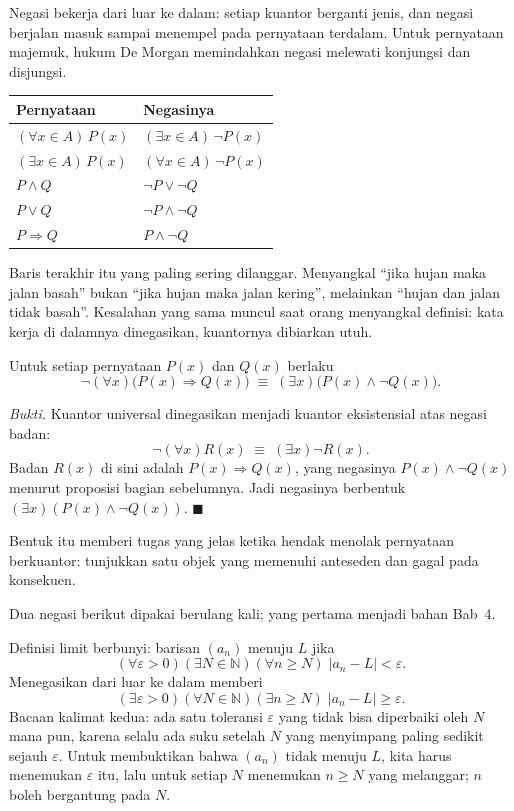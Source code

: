 Negasi bekerja dari luar ke dalam: setiap kuantor berganti jenis, dan negasi berjalan masuk
sampai menempel pada pernyataan terdalam. Untuk pernyataan majemuk, hukum De Morgan
memindahkan negasi melewati konjungsi dan disjungsi.

{\centering
\begin{tabular}{ll}
\hline
Pernyataan & Negasinya \\
\hline
$(\forall x \in A)\,P(x)$ & $(\exists x \in A)\,\neg P(x)$ \\
$(\exists x \in A)\,P(x)$ & $(\forall x \in A)\,\neg P(x)$ \\
$P \wedge Q$ & $\neg P \vee \neg Q$ \\
$P \vee Q$ & $\neg P \wedge \neg Q$ \\
$P \Rightarrow Q$ & $P \wedge \neg Q$ \\
\hline
\end{tabular}\par}

Baris terakhir itu yang paling sering dilanggar. Menyangkal ``jika hujan maka jalan
basah'' bukan ``jika hujan maka jalan kering'', melainkan ``hujan dan jalan tidak basah''.
Kesalahan yang sama muncul saat orang menyangkal definisi: kata kerja di dalamnya
dinegasikan, kuantornya dibiarkan utuh.

\begin{proposisi}
Untuk setiap pernyataan $P(x)$ dan $Q(x)$ berlaku
\[
  \neg(\forall x)\bigl(P(x) \Rightarrow Q(x)\bigr)
  \;\equiv\; (\exists x)\bigl(P(x) \wedge \neg Q(x)\bigr).
\]
\end{proposisi}
\par\smallskip\noindent\textit{Bukti.} Kuantor universal dinegasikan menjadi kuantor
eksistensial atas negasi badan:
\[
  \neg(\forall x)R(x) \;\equiv\; (\exists x)\neg R(x).
\]
Badan $R(x)$ di sini adalah $P(x) \Rightarrow Q(x)$, yang negasinya $P(x) \wedge
\neg Q(x)$ menurut proposisi bagian sebelumnya. Jadi negasinya berbentuk
$(\exists x)(P(x) \wedge \neg Q(x))$.
\hfill$\blacksquare${\parfillskip=0pt\par}

Bentuk itu memberi tugas yang jelas ketika hendak menolak pernyataan berkuantor: tunjukkan
satu objek yang memenuhi anteseden dan gagal pada konsekuen.

Dua negasi berikut dipakai berulang kali; yang pertama menjadi bahan Bab~4.

\begin{contoh}
Definisi limit berbunyi: barisan $(a_{n})$ menuju $L$ jika
\[
  (\forall \varepsilon > 0)(\exists N \in \mathbb{N})(\forall n \geq N)\;
  |a_{n} - L| < \varepsilon .
\]
Menegasikan dari luar ke dalam memberi
\[
  (\exists \varepsilon > 0)(\forall N \in \mathbb{N})(\exists n \geq N)\;
  |a_{n} - L| \geq \varepsilon .
\]
Bacaan kalimat kedua: ada satu toleransi $\varepsilon$ yang tidak bisa diperbaiki oleh
$N$ mana pun, karena selalu ada suku setelah $N$ yang menyimpang paling sedikit sejauh
$\varepsilon$. Untuk membuktikan bahwa $(a_{n})$ tidak menuju $L$, kita harus menemukan
$\varepsilon$ itu, lalu untuk setiap $N$ menemukan $n \geq N$ yang melanggar; $n$ boleh
bergantung pada $N$.
\end{contoh}

